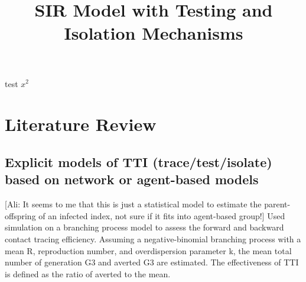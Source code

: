 \documentclass{article}
\title{SIR Model with Testing and Isolation Mechanisms}
\begin{document}
\maketitle
test $x^2$

\section{Literature Review}

\subsection{Explicit models of TTI (trace/test/isolate) based on network or agent-based models}

\citep{endo2020implication} [Ali: It seems to me that this is just a statistical model to estimate the parent-offspring of an infected index, not sure if it fits into agent-based group!] Used simulation on a branching process model to assess the forward and backward contact tracing efficiency. Assuming a negative-binomial branching process with a mean R, reproduction number, and overdispersion parameter k, the mean total number of generation G3 and averted G3 are estimated. The effectiveness of TTI is defined as the ratio of averted to the mean.


\end{document}
